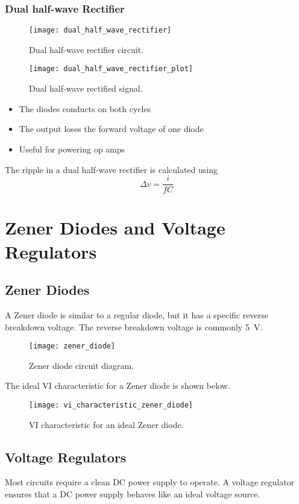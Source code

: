 \documentclass{article}
\begin{document}
\subsubsection{Dual half-wave Rectifier}
\begin{figure}[H]
    \centering
    \texttt{[image: dual\_half\_wave\_rectifier]}
    \caption{Dual half-wave rectifier circuit.}
\end{figure}
\begin{figure}[H]
    \centering
    \texttt{[image: dual\_half\_wave\_rectifier\_plot]}
    \caption{Dual half-wave rectified signal.}
\end{figure}
\begin{itemize}
    \item The diodes conducts on both cycles 
    \item The output loses the forward voltage of one diode
    \item Useful for powering op amps
\end{itemize}
The ripple in a dual half-wave rectifier is calculated using
\begin{equation*}
    \Delta v = \frac{i}{fC}
\end{equation*}
\newpage
\section{Zener Diodes and Voltage Regulators}
\subsection{Zener Diodes}
A Zener diode is similar to a regular diode, but it has a specific
reverse breakdown voltage. The reverse breakdown voltage is commonly \SI{5}{\volt}.
\begin{figure}[H]
    \centering
    \texttt{[image: zener\_diode]}
    \caption{Zener diode circuit diagram.}
\end{figure}
The ideal VI characteristic for a Zener diode is shown below.
\begin{figure}[H]
    \centering
    \texttt{[image: vi\_characteristic\_zener\_diode]}
    \caption{VI characteristic for an ideal Zener diode.}
\end{figure}
\subsection{Voltage Regulators}
Most circuits require a clean DC power supply to operate. 
A voltage regulator ensures that a DC power supply behaves like an ideal voltage source.
\end{document}
